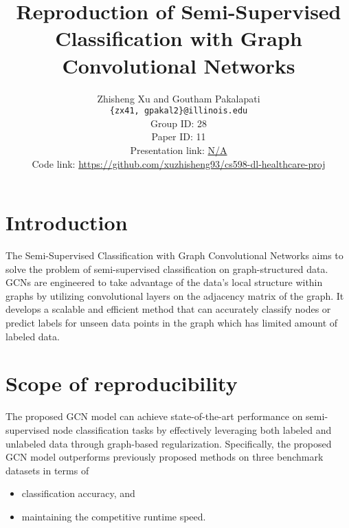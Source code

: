 \documentclass[11pt,a4paper]{article}
\title{Reproduction of Semi-Supervised Classification with Graph Convolutional Networks}
\author{Zhisheng Xu and Goutham Pakalapati\\
  \texttt{\{zx41, gpakal2\}@illinois.edu}
  \\[2em]
  Group ID: 28\\
  Paper ID: 11\\
  Presentation link: \url{N/A} \\
  Code link: \url{https://github.com/xuzhisheng93/cs598-dl-healthcare-proj}
}
\begin{document}
\maketitle


\section{Introduction}

The Semi-Supervised Classification with Graph Convolutional Networks \cite{kipf2017semi} aims to solve the problem of semi-supervised classification on graph-structured data. GCNs are engineered to take advantage of the data's local structure within graphs by utilizing convolutional layers on the adjacency matrix of the graph. It develops a scalable and efficient method that can accurately classify nodes or predict labels for unseen data points in the graph which has limited amount of labeled data.

\section{Scope of reproducibility}

The proposed GCN model can achieve state-of-the-art performance on semi-supervised node classification tasks by effectively leveraging both labeled and unlabeled data through graph-based regularization. Specifically, the proposed GCN model outperforms previously proposed methods on three benchmark datasets in terms of

\begin{itemize}
    \item classification accuracy, and
    \item maintaining the competitive runtime speed.
\end{itemize}

\end{document}
